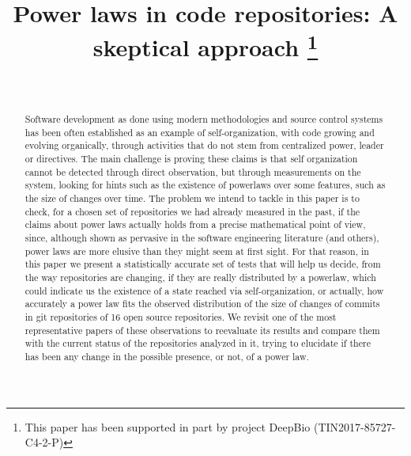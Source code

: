 \documentclass[conference]{IEEEtran}
\begin{document}
\title{Power laws in code repositories: A skeptical approach
  \thanks{ This paper has been supported in part by
    project DeepBio (TIN2017-85727-C4-2-P)}
}

\author{
\and
{}
\\

}

\maketitle

\begin{abstract}
  
Software development as done using modern methodologies and source
control systems has been often established as an example of
self-organization, with code growing and evolving organically, through
activities that do not stem from centralized power, leader or
directives.  The main challenge is proving these claims is that self
organization cannot be detected through direct observation, but
through measurements on the system, looking for hints such as the
existence of powerlaws over some features, such as the size of changes
over time.  The problem we intend to tackle in this paper is to check,
for a chosen set of repositories we had already measured in the past,
if the claims about power laws actually holds from a precise
mathematical point of view, since, although shown as pervasive in the
software engineering literature (and others), power laws are more
elusive than they might seem at first sight. For that reason, in this
paper we present a statistically accurate set of tests that will help
us decide, from the way repositories are changing, if they are really
distributed by a powerlaw, which could indicate us the existence of a
state reached via self-organization, or actually, how accurately a
power law fits the observed distribution of the size of changes of
commits in git repositories of 16 open source repositories.  We
revisit one of the most representative papers of these observations to
reevaluate its results and compare them with the current status of the
repositories analyzed in it, trying to elucidate if there has been any
change in the possible presence, or not, of a power law.


\end{abstract}
\end{document}
